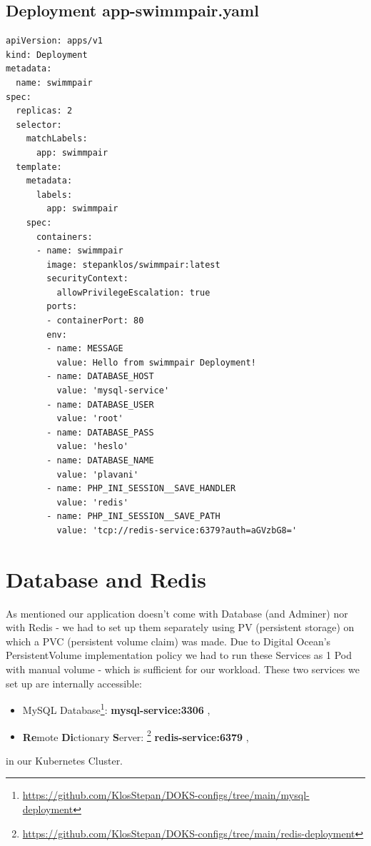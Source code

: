 \subsection*{Deployment app-swimmpair.yaml}
\begin{lstlisting}
apiVersion: apps/v1
kind: Deployment
metadata:
  name: swimmpair
spec:
  replicas: 2
  selector:
    matchLabels:
      app: swimmpair
  template:
    metadata:
      labels:
        app: swimmpair
    spec:
      containers:
      - name: swimmpair
        image: stepanklos/swimmpair:latest
        securityContext:
          allowPrivilegeEscalation: true
        ports:
        - containerPort: 80
        env:
        - name: MESSAGE
          value: Hello from swimmpair Deployment!
        - name: DATABASE_HOST
          value: 'mysql-service'
        - name: DATABASE_USER
          value: 'root'
        - name: DATABASE_PASS
          value: 'heslo'
        - name: DATABASE_NAME
          value: 'plavani' 
        - name: PHP_INI_SESSION__SAVE_HANDLER
          value: 'redis'
        - name: PHP_INI_SESSION__SAVE_PATH
          value: 'tcp://redis-service:6379?auth=aGVzbG8='
\end{lstlisting}    
\section*{Database and Redis}
As mentioned our application doesn't come with Database (and Adminer) nor with Redis - we had to set up them separately using PV (persistent storage) on which a PVC (persistent volume claim) was made. Due to Digital Ocean's PersistentVolume implementation policy we had to run these Services as 1 Pod with manual volume - which is sufficient for our workload.  
\newline
These two services we set up are internally accessible:
\begin{itemize}
    \item MySQL Database\footnote{\url{https://github.com/KlosStepan/DOKS-configs/tree/main/mysql-deployment}}: \textbf{mysql-service:3306} ,
    \item \textbf{Re}mote \textbf{Di}ctionary \textbf{S}erver: \footnote{\url{https://github.com/KlosStepan/DOKS-configs/tree/main/redis-deployment}} \textbf{redis-service:6379} ,
\end{itemize}
in our Kubernetes Cluster.
